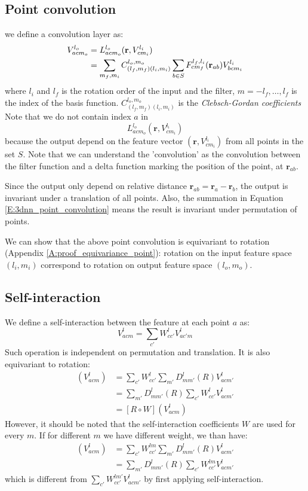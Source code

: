 \documentclass{IEEEtran}
\begin{document}
\subsection*{Point convolution}
we define a convolution layer as:
\begin{align}
    V_{acm_o}^{l_o} &= L^{l_o}_{acm_o} (\mathbf{r}, V_{cm_i}^{l_i}) \notag\\
    &= \sum_{m_f, m_i} C^{l_o,m_o}_{(l_f, m_f)(l_i,m_i)} \sum_{b \in S} F_{cm_f}^{l_f, l_i}(\mathbf{r}_{ab}) V^{l_i}_{bcm_i} \label{E:3dnn_point_convolution}
\end{align}
where $l_i$ and $l_f$ is the rotation order of the input and the filter, $m = -l_f, \dots, l_f$ is the index of the basis function.
$C^{l_o,m_o}_{(l_f, m_f)(l_i,m_i)}$ is the \emph{Clebsch-Gordan coefficients}
Note that we do not contain index $a$ in \[L^{l_o}_{acm_o} (\mathbf{r}, V_{cm_i}^{l_i})\] because
the output depend on the feature vector $(\mathbf{r}, V_{cm_i}^{l_i})$ from all points in the set $S$.
Note that we can understand the 'convolution' as the convolution between the filter function and a delta function 
marking the position of the point, at $\mathbf{r}_{ab}$.

Since the output only depend on relative distance $\mathbf{r}_{ab} = \mathbf{r}_{a} - \mathbf{r}_{b} $, 
the output is invariant under a translation of all points. Also, the summation in Equation \eqref{E:3dnn_point_convolution}
means the result is invariant under permutation of points.

We can show that the above point convolution is equivariant to rotation (Appendix \ref{A:proof_equivariance_point}):
rotation on the input feature space $(l_i,m_i)$ 
correspond to rotation on output feature space $(l_o,m_o)$.

\subsection*{Self-interaction}
We define a self-interaction between the feature at each point $a$ as:
\begin{equation}
    V_{acm}^{l} = \sum_{c'} W^{l}_{cc'} V_{ac'm}^{l} 
\end{equation}
Such operation is independent on permutation and translation. It is also equivariant to rotation:
\begin{align*}
    [ W \circ R ] (V_{acm}^l) &= \sum_{c'} W^{l}_{cc'} \sum_{m'}D_{mm'}^l(R)V_{acm'}^l \\
                &= \sum_{m'}D_{mm'}^l(R) \sum_{c'} W^{l}_{cc'}  V_{acm'}^l \\
                &= [ R \circ W ] (V_{acm}^l)
\end{align*}
However, it should be noted that the self-interaction coefficients $W$ are used for every $m$. 
If for different $m$ we have different weight, we than have:
\begin{align*}
    [ W \circ R ] (V_{acm}^l) &= \sum_{c'} W^{lm}_{cc'} \sum_{m'}D_{mm'}^l(R)V_{acm'}^l \\
                &= \sum_{m'}D_{mm'}^l(R) \sum_{c'} W^{lm}_{cc'}  V_{acm'}^l 
\end{align*}
which is different from $\sum_{c'} W^{lm'}_{cc'}  V_{acm'}^l$ by first applying self-interaction.
\end{document}

